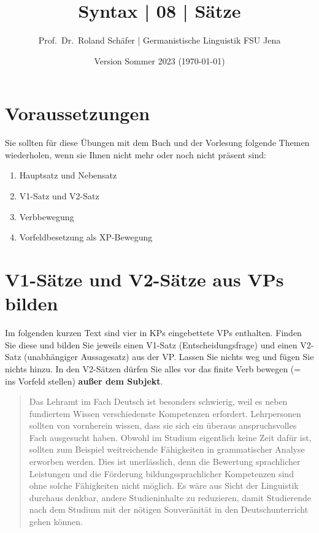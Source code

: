 \documentclass[12pt,a4paper,twoside]{article}
\author{Prof.\ Dr.\ Roland Schäfer | Germanistische Linguistik FSU Jena}
\title{Syntax | 08 | Sätze}
\date{Version Sommer 2023 (\today)}
\newcommand{\Zeile}{\vspace{\baselineskip}}
\newcommand{\Lf}{
  \setlength{\itemsep}{1pt}
  \setlength{\parskip}{0pt}
  \setlength{\parsep}{0pt}
}
\begin{document}
\maketitle

\section*{Voraussetzungen}

Sie sollten für diese Übungen mit dem Buch und der Vorlesung folgende Themen wiederholen, wenn sie Ihnen nicht mehr oder noch nicht präsent sind:

\begin{enumerate}\Lf
  \item Hauptsatz und Nebensatz
  \item V1-Satz und V2-Satz
  \item Verbbewegung
  \item Vorfeldbesetzung als XP-Bewegung
\end{enumerate}

\Zeile

\section{V1-Sätze und V2-Sätze aus VPs bilden}\label{sec:bilden}

Im folgenden kurzen Text sind vier in KPs eingebettete VPs enthalten.
Finden Sie diese und bilden Sie jeweils einen V1-Satz (Entscheidungsfrage) und einen V2-Satz (unabhängiger Aussagesatz) aus der VP.
Lassen Sie nichts weg und fügen Sie nichts hinzu.
In den V2-Sätzen dürfen Sie alles vor das finite Verb bewegen (= ins Vorfeld stellen) \textbf{außer dem Subjekt}.

\begin{quote}
  Das Lehramt im Fach Deutsch ist besonders schwierig, weil es neben fundiertem Wissen verschiedenste Kompetenzen erfordert.
  Lehrpersonen sollten von vornherein wissen, dass sie sich ein überaus anspruchsvolles Fach ausgesucht haben.
  Obwohl im Studium eigentlich keine Zeit dafür ist, sollten zum Beispiel weitreichende Fähigkeiten in grammatischer Analyse erworben werden.
  Dies ist unerlässlich, denn die Bewertung sprachlicher Leistungen und die Förderung bildungssprachlicher Kompetenzen sind ohne solche Fähigkeiten nicht möglich.
  Es wäre aus Sicht der Linguistik durchaus denkbar, andere Studieninhalte zu reduzieren, damit Studierende nach dem Studium mit der nötigen Souveränität in den Deutschunterricht gehen können.
\end{quote}
\end{document}
